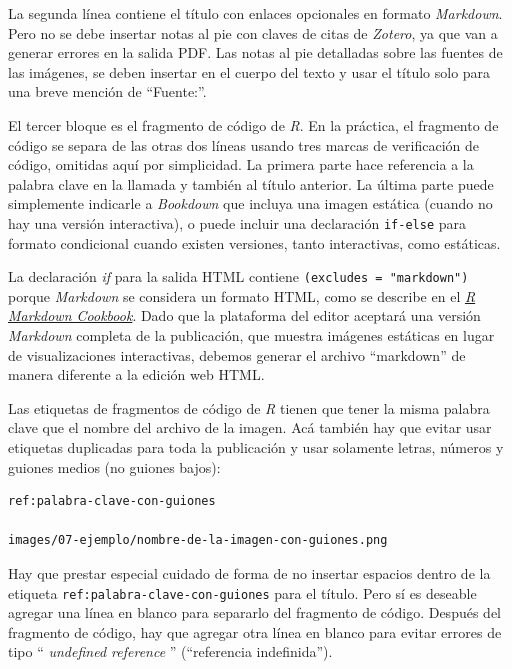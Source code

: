 \documentclass[
]{book}
\begin{document}
La segunda línea contiene el título con enlaces opcionales en formato \emph{Markdown}. Pero no se debe insertar notas al pie con claves de citas de \emph{Zotero}, ya que van a generar errores en la salida PDF. Las notas al pie detalladas sobre las fuentes de las imágenes, se deben insertar en el cuerpo del texto y usar el título solo para una breve mención de ``Fuente:''.

El tercer bloque es el fragmento de código de \emph{R}. En la práctica, el fragmento de código se separa de las otras dos líneas usando tres marcas de verificación de código, omitidas aquí por simplicidad. La primera parte hace referencia a la palabra clave en la llamada y también al título anterior. La última parte puede simplemente indicarle a \emph{Bookdown} que incluya una imagen estática (cuando no hay una versión interactiva), o puede incluir una declaración \texttt{if-else} para formato condicional cuando existen versiones, tanto interactivas, como estáticas.

La declaración \emph{if} para la salida HTML contiene \texttt{(excludes\ =\ "markdown")} porque \emph{Markdown} se considera un formato HTML, como se describe en el \href{https://bookdown.org/yihui/rmarkdown-cookbook/latex-html.html}{\emph{R Markdown Cookbook}}. Dado que la plataforma del editor aceptará una versión \emph{Markdown} completa de la publicación, que muestra imágenes estáticas en lugar de visualizaciones interactivas, debemos generar el archivo ``markdown'' de manera diferente a la edición web HTML.

Las etiquetas de fragmentos de código de \emph{R} tienen que tener la misma palabra clave que el nombre del archivo de la imagen. Acá también hay que evitar usar etiquetas duplicadas para toda la publicación y usar solamente letras, números y guiones medios (no guiones bajos):

\begin{verbatim}
ref:palabra-clave-con-guiones

images/07-ejemplo/nombre-de-la-imagen-con-guiones.png
\end{verbatim}

Hay que prestar especial cuidado de forma de no insertar espacios dentro de la etiqueta \texttt{ref:palabra-clave-con-guiones} para el título. Pero sí es deseable agregar una línea en blanco para separarlo del fragmento de código. Después del fragmento de código, hay que agregar otra línea en blanco para evitar errores de tipo `` \emph{undefined reference} '' (``referencia indefinida'').
\end{document}
